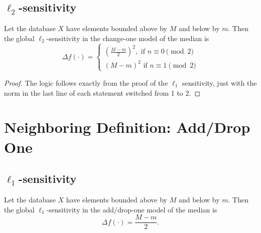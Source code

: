 \documentclass[11pt]{scrartcl} %
\begin{document}
\subsection{$\ell_2$-sensitivity}
\begin{theorem}
	Let the database $X$ have elements bounded above by $M$ and below by $m$.
	Then the global $\ell_2$-sensitivity in the change-one model of the median is
	\[
		\Delta f(\cdot) =
			\begin{cases}
				\left( \frac{M - m}{2} \right)^2, \text{ if } n \equiv 0 \pmod{2} \\
				(M-m)^2 \text{ if } n \equiv 1 \pmod{2}
			\end{cases}
	\]
\end{theorem}

\begin{proof}
	The logic follows exactly from the proof of the $\ell_1$ sensitivity,
	just with the norm in the last line of each statement switched from 1 to 2.
\end{proof}

\section{Neighboring Definition: Add/Drop One}

\subsection{$\ell_1$-sensitivity}

\begin{theorem}
Let the database $X$ have elements bounded above by $M$ and below by $m$. Then the global $\ell_1$-sensitivity in the add/drop-one model of the median is
$$ \Delta f(\cdot) = \frac{M-m}{2}.$$
\end{theorem}
\end{document}
